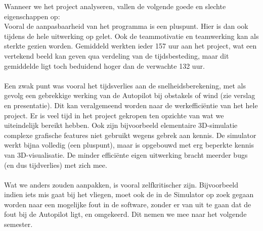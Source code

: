\documentclass[]{penoverslag}
\begin{document}
Wanneer we het project analyseren, vallen de volgende goede en slechte eigenschappen op: \\
Vooral de aanpasbaarheid van het programma is een pluspunt. Hier is dan ook tijdens de hele uitwerking op gelet. Ook de teammotivatie en teamwerking kan als sterkte gezien worden. Gemiddeld werkten ieder 157 uur aan het project, wat een vertekend beeld kan geven qua verdeling van de tijdsbesteding, maar dit gemiddelde ligt toch beduidend hoger dan de verwachte 132 uur.
\\
\\
Een zwak punt was vooral het tijdsverlies aan de snelheidsberekening, met als gevolg een gebrekkige werking van de Autopilot bij obstakels of wind (zie verslag en presentatie). Dit kan veralgemeend worden naar de werkeffici\"entie van het hele project. Er is veel tijd in het project gekropen ten opzichte van wat we uiteindelijk bereikt hebben. Ook zijn bijvoorbeeld elementaire 3D-simulatie complexe grafische features niet gebruikt wegens gebrek aan kennis. De simulator werkt bijna volledig (een pluspunt), maar is opgebouwd met erg beperkte kennis van 3D-visualisatie. De minder effici\"ente eigen uitwerking bracht meerder bugs (en dus tijdverlies) met zich mee.
\\
\\
Wat we anders zouden aanpakken, is vooral zelfkritischer zijn. Bijvoorbeeld indien iets mis gaat bij het vliegen, moet ook de in de Simulator op zoek gegaan worden naar een mogelijke fout in de software, zonder er van uit te gaan dat de fout bij de Autopilot ligt, en omgekeerd. Dit nemen we mee naar het volgende semester.
\end{document}
